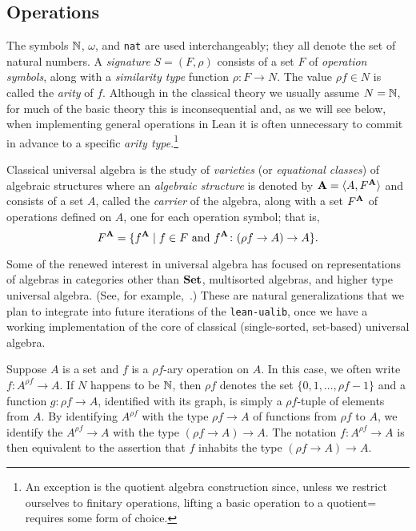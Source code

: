 \documentclass[12pt]{amsart}  %
\begin{document}
\subsection{Operations}
The symbols $\mathbb{N}$, $\omega$, and {\tt nat} are used interchangeably; they all denote the 
set of natural numbers. A \emph{signature} $S = (F, \rho)$ consists of a set $F$ of 
\emph{operation symbols}, along with a \emph{similarity type} function $\rho \colon F \to N$. 
The value $\rho f \in N$  is called the \emph{arity} of $f$. Although in the classical theory 
we usually assume $N = \mathbb{N}$, for much of the basic theory this is inconsequential and, as 
we will see below, when implementing general operations in Lean
it is often unnecessary to commit in advance to a specific 
\emph{arity type}.\footnote{An exception is the quotient algebra construction
since, unless we restrict ourselves to finitary operations, lifting a basic operation 
to a quotient= requires some form of choice.}

Classical universal algebra is the study of \emph{varieties} (or \emph{equational classes}) 
of algebraic structures where an \emph{algebraic structure} is denoted by $\mathbf{A} = \langle A, F^{\mathbf{A}}\rangle$ and consists of a set $A$, called the \emph{carrier} of the algebra, along with a set $F^{\mathbf{A}}$ of operations defined on $A$, one for each operation symbol; that is,
\[F^{\mathbf{A}} = \{f^{\mathbf{A}} \mid f\in F \text{ and } f^{\mathbf{A}} \colon (\rho f \to A) \to A\}.\] 

Some of the renewed interest in universal algebra has focused on representations of algebras 
in categories other than $\mathbf{Set}$, multisorted algebras, and higher type universal algebra.  
(See, for example,~\cite{MR2757312,MR3003214,finster:2018,gepner:2018,MR1173632}.)  These are natural generalizations that we plan to integrate into future iterations of the 
\lstinline{lean-ualib}, once we have a working implementation of the core of classical (single-sorted, set-based) universal algebra.

Suppose $A$ is a set and $f$ is a $\rho f$-ary 
operation on $A$. In this case, we often write $f \colon A^{\rho f} \to A$.  
If $N$ happens to be $\mathbb{N}$, then $\rho f$ 
denotes the set $\{0, 1, \dots, \rho f -1\}$ and a function $g \colon \rho f \to A$, identified with its graph, is simply a $\rho f$-tuple of elements from $A$.
By identifying $A^{\rho f}$ with the type $\rho f \to A$ of functions from $\rho f$ to $A$, 
we identify the $A^{\rho f} \to A$ with the type 
$(\rho f \to A) \to A$. 
The notation $f \colon A^{\rho f} \to A$ is then equivalent to the assertion that $f$ inhabits
the type $(\rho f \to A) \to A$. 
\end{document}
